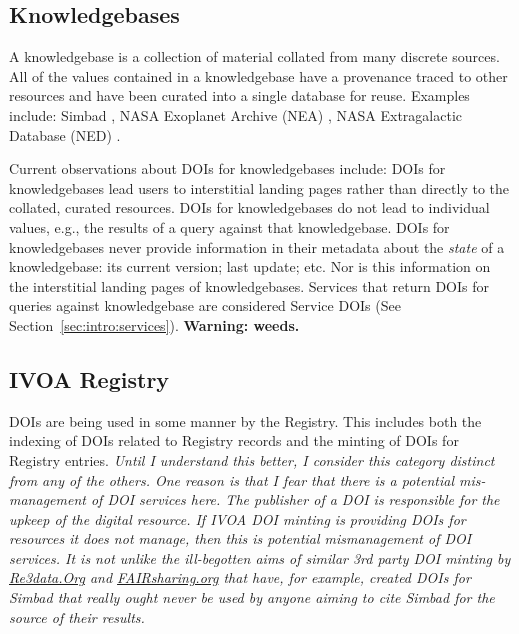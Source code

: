 \documentclass[11pt,a4paper]{ivoa}
\begin{document}
\subsection{Knowledgebases}
\label{sec:intro:kdbs}

A knowledgebase is a collection of material collated from many discrete sources.
All of the values contained in a knowledgebase have a provenance traced to other resources and have been curated into a single database for reuse.
Examples include: Simbad \citep[as originally described in, ][]{2000A&AS..143....9W}, NASA Exoplanet Archive (NEA) \citep{NEA12-doi2bib} \citep[as originally described in,][]{2013PASP..125..989A}, NASA Extragalactic Database (NED) \citep{NED1-doi2bib} \citep[as originally described in,][]{1991ASSL..171...89H}. 

Current observations about DOIs for knowledgebases include:
DOIs for knowledgebases lead users to interstitial landing pages rather than directly to the collated, curated resources.
DOIs for knowledgebases do not lead to individual values, e.g., the results of a query against that knowledgebase.
DOIs for knowledgebases never provide information in their metadata about the \textit{state} of a knowledgebase: its current version; last update; etc. 
Nor is this information on the interstitial landing pages of knowledgebases.
Services that return DOIs for queries against knowledgebase are considered Service DOIs (See Section~\ref{sec:intro:services}).
\textbf{Warning: weeds.}

\subsection{IVOA Registry}
DOIs are being used in some manner by the Registry.
This includes both the indexing of DOIs related to Registry records and the minting of DOIs for Registry entries.
\textit{Until I understand this better, I consider this category distinct from any of the others.  One reason is that I fear that there is a potential mis-management of DOI services here. The publisher of a DOI is responsible for the upkeep of the digital resource. If IVOA DOI minting is providing DOIs for resources it does not manage, then this is potential mismanagement of DOI services. It is not unlike the ill-begotten aims of similar 3rd party DOI minting by \url{Re3data.Org} and \url{FAIRsharing.org} that have, for example, created DOIs for Simbad \citep{https://doi.org/10.17616/r39w29,https://doi.org/10.25504/fairsharing.rd6gxr} that really ought never be used by anyone aiming to cite Simbad for the source of their results. }
\end{document}
